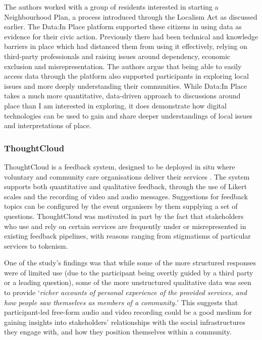 The authors worked with a group of residents interested in starting a Neighbourhood Plan, a process introduced through the Localism Act as discussed earlier. The Data:In Place platform supported these citizens in using data as evidence for their civic action. Previously there had been technical and knowledge barriers in place which had distanced them from using it effectively, relying on third-party professionals and raising issues around dependency, economic exclusion and misrepresentation. The authors argue that being able to easily access data through the platform also supported participants in exploring local issues and more deeply understanding their communities. While Data:In Place takes a much more quantitative, data-driven approach to discussions around place than I am interested in exploring, it does demonstrate how digital technologies can be used to gain and share deeper understandings of local issues and interpretations of place.

\subsubsection{ThoughtCloud}

ThoughtCloud is a feedback system, designed to be deployed in situ where voluntary and community care organisations deliver their services \citep{Dow2016}. The system supports both quantitative and qualitative feedback, through the use of Likert scales and the recording of video and audio messages. Suggestions for feedback topics can be configured by the event organisers by them supplying a set of questions. ThoughtCloud was motivated in part by the fact that stakeholders who use and rely on certain services are frequently under or misrepresented in existing feedback pipelines, with reasons ranging from stigmatisms of particular services to tokenism.

One of the study's findings was that while some of the more structured responses were of limited use (due to the participant being overtly guided by a third party or a leading question), some of the more unstructured qualitative data was seen to provide `\textit{richer accounts of personal experience of the provided services, and how people saw themselves as members of a community.}' This suggests that participant-led free-form audio and video recording could be a good medium for gaining insights into stakeholders' relationships with the social infrastructures they engage with, and how they position themselves within a community.

